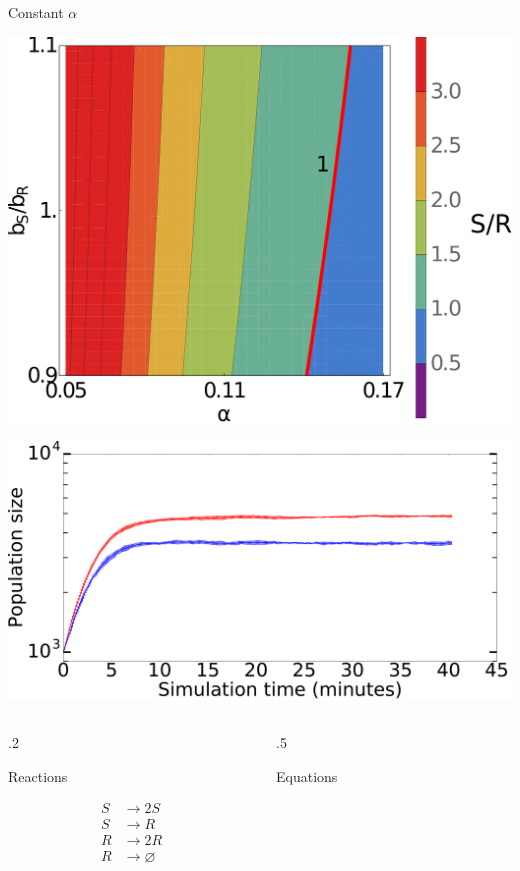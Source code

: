 \documentclass[final]{beamer}
\newlength{\onecolwid}
\newlength{\figwid}
\begin{document}
\begin{frame}[t]
\begin{block}
\begin{columns}[t]
\begin{column}{\onecolwid}
  \begin{block}{Constant $\alpha$}
  \begin{center}
    \includegraphics[width=\figwid]{../dev/graphics/poster/const_contour.pdf}

    \includegraphics[width=\figwid]{../dev/graphics/poster/const_pop.pdf}
  \end{center}

  \begin{columns}[t]
    \begin{column}{.2\onecolwid}
      \begin{center}
        Reactions
      \end{center}
      \begin{align*}
        S &\rightarrow 2S \\
        S &\rightarrow  R \\
        R &\rightarrow 2R \\
        R &\rightarrow \varnothing
      \end{align*}
    \end{column}
      \vrule
    \begin{column}{.5\onecolwid}
      \begin{center}
        Equations
      \end{center}


\end{column}
\end{columns}
\end{block}
\end{column}
\end{columns}
\end{block}
\end{frame}
\end{document}

